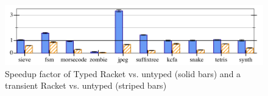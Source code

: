 \begin{figure}[h]
  \includegraphics[width=0.8\columnwidth]{src/icfp-bars.png}
  \caption{Speedup factor of Typed Racket vs. untyped (solid bars) and a transient Racket vs. untyped (striped bars)~\cite{gf-icfp-2018}}
  \label{fig:icfp-bars}
\end{figure}



